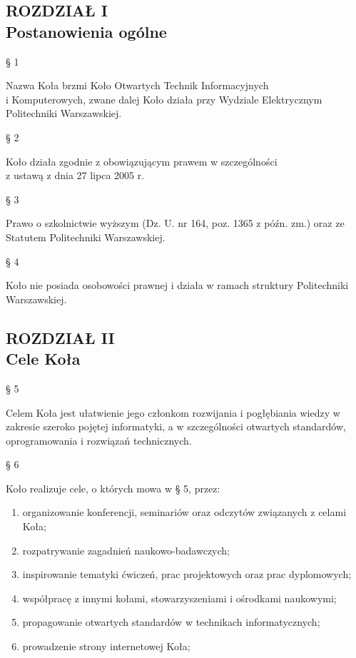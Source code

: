 \documentclass[a4paper,11pt]{article}
\renewcommand{\paragraph}[1] {\begin{center}§ {#1}\end{center}}
\newcommand{\content}[1] {\begin{flushleft}{#1}\end{flushleft}}
\newcommand{\chapter}[2] {\begin{center}\section*{ROZDZIAŁ {#1} \\ {#2}}\end{center}}
\begin{document}
\chapter{I}{Postanowienia ogólne}

\paragraph{1}
\content{Nazwa Koła brzmi Koło Otwartych Technik Informacyjnych \\  i Komputerowych, zwane dalej Koło działa przy Wydziale Elektrycznym Politechniki Warszawskiej.}

\paragraph{2}
\content{Koło działa zgodnie z obowiązującym prawem w szczególności \\ z ustawą z dnia 27 lipca 2005 r.}

\paragraph{3}
\content{Prawo  o  szkolnictwie  wyższym (Dz.  U.  nr  164,  poz.  1365  z  późn.  zm.)  oraz  ze  Statutem Politechniki Warszawskiej.}

\paragraph{4}
\content{Koło nie posiada osobowości prawnej i działa w ramach struktury Politechniki Warszawskiej.}

\chapter{II}{Cele Koła}

\paragraph{5}
\content{Celem Koła jest ułatwienie jego członkom rozwijania i pogłębiania wiedzy w zakresie szeroko pojętej  informatyki,  a  w  szczególności  otwartych  standardów,  oprogramowania  i  rozwiązań technicznych.}

\paragraph{6}
Koło realizuje cele, o których mowa w § 5, przez: 
\begin{enumerate}
	\item organizowanie konferencji, seminariów oraz odczytów związanych z celami Koła;
	\item rozpatrywanie zagadnień naukowo-badawczych;
	\item inspirowanie tematyki ćwiczeń, prac projektowych oraz prac dyplomowych;
	\item współpracę z innymi kołami, stowarzyszeniami i ośrodkami naukowymi;
	\item propagowanie otwartych standardów w technikach informatycznych;
	\item prowadzenie strony internetowej Koła;
\end{enumerate}
\end{document}
